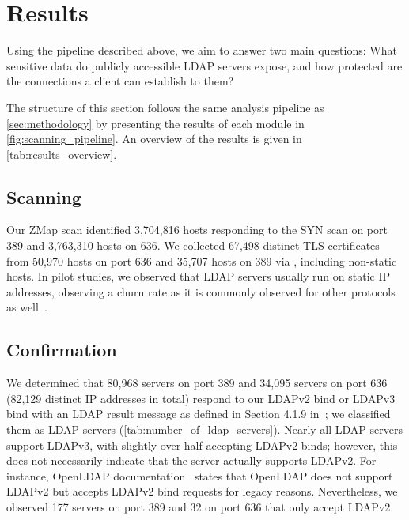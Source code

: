 

\section{Results}
\label{sec:results}

Using the pipeline described above, we aim to answer two main questions: What sensitive data do publicly accessible LDAP servers expose, and how protected are the connections a client can establish to them?

The structure of this section follows the same analysis pipeline as \cref{sec:methodology} by presenting the results of each module in \cref{fig:scanning_pipeline}. An overview of the results is given in \cref{tab:results_overview}.

\subsection{Scanning}
Our ZMap scan identified 3,704,816 hosts responding to the SYN scan on port 389 and 3,763,310 hosts on 636. We collected 67,498 distinct TLS certificates from 50,970 hosts on port 636 and 35,707 hosts on 389 via \starttls, including non-static hosts. In pilot studies, we observed that \acrshort{LDAP} servers usually run on static IP addresses, observing a churn rate as it is commonly observed for other protocols as well~\cite{MouraEtAl_HowDynamicISPs_2015}.






\subsection{Confirmation}

We determined that 80,968 servers on port 389 and 34,095 servers on port 636 (82,129 distinct IP addresses in total) respond to our LDAPv2 bind or LDAPv3 bind with an LDAP result message as defined in Section 4.1.9 in~\cite{rfc4511}; we classified them as LDAP servers (\cref{tab:number_of_ldap_servers}). Nearly all LDAP servers support LDAPv3, with slightly over half accepting LDAPv2 binds; however, this does not necessarily indicate that the server actually supports LDAPv2. For instance, OpenLDAP documentation~\cite{OpenLDAPSoftwareAdministrator} states that OpenLDAP does not support LDAPv2 but accepts LDAPv2 bind requests for legacy reasons. Nevertheless, we observed 177 servers on port 389 and 32 on port 636 that only accept LDAPv2.

